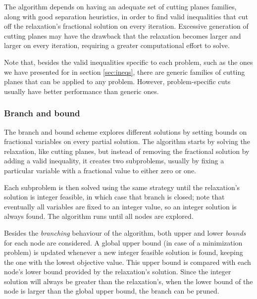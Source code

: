 The algorithm depends on having an adequate set of cutting planes families, along with good separation heuristics, in order to find valid inequalities that cut off the relaxation's fractional solution on every iteration. Excessive generation of cutting planes may have the drawback that the relaxation becomes larger and larger on every iteration, requiring a greater computational effort to solve.

Note that, besides the valid inequalities specific to each problem, such as the ones we have presented for \PCP{} in section \ref{sec:ineqs}, there are generic families of cutting planes that can be applied to any problem. However, problem-specific cuts usually have better performance than generic ones.

\subsubsection*{Branch and bound}

The branch and bound scheme explores different solutions by setting bounds on fractional variables on every partial solution. The algorithm starts by solving the relaxation, like cutting planes, but instead of removing the fractional solution by adding a valid inequality, it creates two subproblems, usually by fixing a particular variable with a fractional value to either zero or one. 

Each subproblem is then solved using the same strategy until the relaxation's solution is integer feasible, in which case that branch is closed; note that eventually all variables are fixed to an integer value, so an integer solution is always found. The algorithm runs until all nodes are explored.

Besides the \textit{branching} behaviour of the algorithm, both upper and lower \textit{bounds} for each node are considered. A global upper bound (in case of a minimization problem) is updated whenever a new integer feasible solution is found, keeping the one with the lowest objective value. This upper bound is compared with each node's lower bound provided by the relaxation's solution. Since the integer solution will always be greater than the relaxation's, when the lower bound of the node is larger than the global upper bound, the branch can be pruned.

